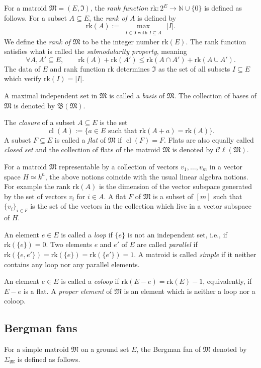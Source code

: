 \documentclass[11pt]{amsart}
\theoremstyle{definition}
\newenvironment{example}
  {\pushQED{\qed}\renewcommand{\qedsymbol}{$\diamond$}\exx}
  {\popQED\endexx}
\numberwithin{equation}{section}
\renewcommand{\~}{\widetilde}
\DeclareMathOperator{\cl}{cl} %
\newcommand{\Cl}{\mathcal C\!\ell} %
\newcommand{\card}[1]{\lvert#1\rvert} %
\newcommand{\Ma}{\mathfrak M} %
\newcommand{\bases}{\mathfrak B}
\newcommand{\ind}{\mathfrak I}
\newcommand{\rkm}{\mathrm{rk}}
\begin{document}
For a matroid $\Ma=(E,\ind)$, the \emph{rank function} $\rkm\colon 2^E \to \mathbb N \cup\{0\}$ is defined as follows. For a subset $A \subseteq E$, the \emph{rank of $A$} is defined by
\[ \rkm(A):=\max_{\substack{I \in \ind \textrm{ with }I \subseteq A}} \, \card I. \]
We define the \emph{rank of $\Ma$} to be the integer number $\rkm(E)$. The rank function satisfies what is called the \emph{submodularity property}, meaning
\[\forall A, A' \subseteq E, \qquad \rkm(A) + \rkm(A') \leq \rkm(A\cap A') + \rkm(A \cup A').\]
The data of $E$ and rank function $\rkm$ determines $\ind$ as the set of all subsets $I \subseteq E$ which verify $\rkm(I) = \card{I}$.

A maximal independent set in $\Ma$ is called a \emph{basis} of $\Ma$. The collection of bases of $\Ma$ is denoted by $\bases(\Ma)$.

The \emph{closure} of a subset $A \subseteq E$ is the set
\[ \cl(A):=\{a \in E \textrm{ such that }  \rkm(A + a)=\rkm(A)\}. \]
A subset $F \subseteq E$ is called a \emph{flat} of $\Ma$ if $\cl(F) = F$. Flats are also equally called \emph{closed set} and the collection of flats of the matroid $\Ma$ is denoted by $\Cl(\Ma)$.

\begin{example}[Example~\ref{ex:representable} continued] For a matroid $\Ma$ representable by a collection of vectors $v_1, \dots, v_m$ in a vector space $ H \simeq k^n$, the above notions coincide with the usual linear algebra notions. For example the rank $\rkm(A)$ is the dimension of the vector subspace generated by the set of vectors $v_i$ for $i\in A$. A flat $F$ of $\Ma$ is a subset of $[m]$ such that $\{v_i\}_{i\in F}$ is the set of the vectors in the collection which live in a vector subspace of $H$.
\end{example}

An element $e\in E$ is called a \emph{loop} if $\{e\}$ is not an independent set, i.e., if $\rkm(\{e\})=0$. Two elements $e$ and $e'$ of $E$ are called \emph{parallel} if $\rkm(\{e, e'\}) = \rkm(\{e\}) = \rkm(\{e'\}) = 1$. A matroid is called \emph{simple} if it neither contains any loop nor any parallel elements.

An element $e\in E$ is called a \emph{coloop} if $\rkm(E-e)=\rkm(E)-1$, equivalently, if $E-e$ is a flat. A \emph{proper element} of $\Ma$ is an element which is neither a loop nor a coloop.



\subsection{Bergman fans} For a simple matroid $\Ma$ on a ground set $E$, the Bergman fan of $\Ma$ denoted by $\Sigma_\Ma$ is defined as follows.
\end{document}
